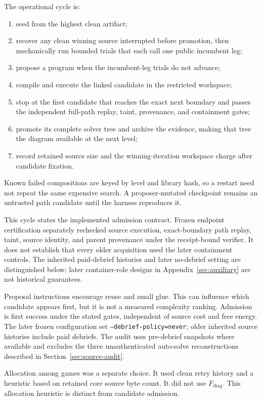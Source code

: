 \documentclass[11pt]{article}
\theoremstyle{definition}
\theoremstyle{remark}
\begin{document}
The operational cycle is:
\begin{enumerate}[leftmargin=2.1em]
\item seed from the highest clean artifact;
\item recover any clean winning source interrupted before promotion, then mechanically
run bounded trials that each call one public incumbent leg;
\item propose a program when the incumbent-leg trials do not advance;
\item compile and execute the linked candidate in the restricted workspace;
\item stop at the first candidate that reaches the exact next boundary and passes the
independent full-path replay, taint, provenance, and containment gates;
\item promote its complete solver tree and archive the evidence, making that tree the
diagram available at the next level;
\item record retained source size and the winning-iteration workspace charge after
candidate fixation.
\end{enumerate}
Known failed compositions are keyed by level and library hash, so a restart need not
repeat the same expensive search. A proposer-mutated checkpoint remains an untrusted
path candidate until the harness reproduces it.

This cycle states the implemented admission contract. Frozen endpoint certification
separately rechecked source execution, exact-boundary path replay, taint, source
identity, and parent provenance under the receipt-bound verifier. It does not establish
that every older acquisition used the later containment controls. The inherited
paid-debrief histories and later no-debrief setting are distinguished below; later
container-role designs in Appendix~\ref{sec:auxiliary} are not historical guarantees.

Proposal instructions encourage reuse and small glue. This can influence which
candidate appears first, but it is not a measured complexity ranking. Admission is
first success under the stated gates, independent of source cost and free energy. The
later frozen configuration set \texttt{--debrief-policy=never}; older inherited source
histories include paid debriefs. The audit uses pre-debrief snapshots where available
and excludes the three unauthenticated auto-solve reconstructions described in
Section~\ref{sec:source-audit}.

Allocation among games was a separate choice. It used clean retry history and a
heuristic based on retained core source byte count. It did not use
$F_{\mathrm{diag}}$. This allocation heuristic is distinct from candidate admission.
\end{document}
